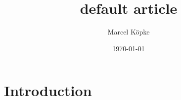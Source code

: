 \documentclass[a4paper, 12pt]{article}
\title{default article}
\author{Marcel Köpke}
\date{\today}
\begin{document}
\maketitle

\tableofcontents


\section{Introduction}
\label{sec:introduction}



\printbibliography
\end{document}
